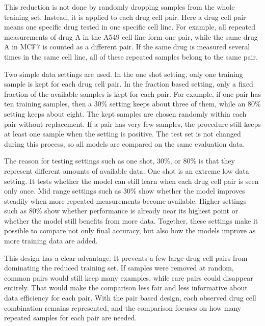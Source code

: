 \noindent This reduction is not done by randomly dropping samples from the whole training set. Instead, it is applied to each drug cell pair. Here a drug cell pair means one specific drug tested in one specific cell line. For example, all repeated measurements of drug A in the A549 cell line form one pair, while the same drug A in MCF7 is counted as a different pair. If the same drug is measured several times in the same cell line, all of these repeated samples belong to the same pair.

\noindent Two simple data settings are used. In the one shot setting, only one training sample is kept for each drug cell pair. In the fraction based setting, only a fixed fraction of the available samples is kept for each pair. For example, if one pair has ten training samples, then a 30\% setting keeps about three of them, while an 80\% setting keeps about eight. The kept samples are chosen randomly within each pair without replacement. If a pair has very few samples, the procedure still keeps at least one sample when the setting is positive. The test set is not changed during this process, so all models are compared on the same evaluation data.

\noindent The reason for testing settings such as one shot, 30\%, or 80\% is that they represent different amounts of available data. One shot is an extreme low data setting. It tests whether the model can still learn when each drug cell pair is seen only once. Mid range settings such as 30\% show whether the model improves steadily when more repeated measurements become available. Higher settings such as 80\% show whether performance is already near its highest point or whether the model still benefits from more data. Together, these settings make it possible to compare not only final accuracy, but also how the models improve as more training data are added.

\noindent This design has a clear advantage. It prevents a few large drug cell pairs from dominating the reduced training set. If samples were removed at random, common pairs would still keep many examples, while rare pairs could disappear entirely. That would make the comparison less fair and less informative about data efficiency for each pair. With the pair based design, each observed drug cell combination remains represented, and the comparison focuses on how many repeated samples for each pair are needed.
